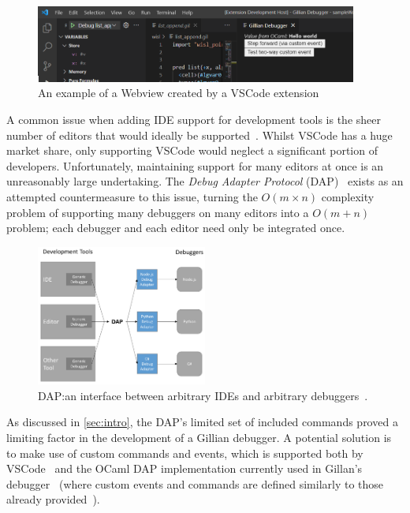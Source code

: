 \begin{figure}
  \center{}
  \includegraphics[width=400px]{img/webview-example.png}
  \caption{An example of a Webview created by a VSCode extension}\label{fig:webview-example}
\end{figure}


A common issue when adding IDE support for development tools is the sheer
number of editors that would ideally be supported~\cite{magpiebridge}. Whilst
VSCode has a huge market share, only supporting VSCode would neglect a
significant portion of developers. Unfortunately, maintaining support for many
editors at once is an unreasonably large undertaking. The \textit{Debug Adapter
Protocol} (DAP)~\cite{dap} exists as an attempted countermeasure to this issue,
turning the $O(m \times n)$ complexity problem of supporting many debuggers on
many editors into a $O(m + n)$ problem; each debugger and each editor need only
be integrated once.

\begin{figure}[!t]
  \centering
  \includegraphics[width=0.5\textwidth]{img/dap-diagram.png}
  \caption{
    DAP:\@ an interface between arbitrary IDEs and
    arbitrary debuggers~\cite{dap}.
  }\label{fig:dap-diagram}
\end{figure}

As discussed in \autoref{sec:intro}, the DAP's limited set of
included commands proved a limiting factor in the development of a Gillian
debugger. A potential solution is to make use of custom commands and events,
which is supported both by
VSCode~\cite{vscode-dap-custom-request, vscode-dap-custom-event} and the OCaml
DAP implementation currently used in Gillan's debugger~\cite{ocaml-dap} (where
custom events and commands are defined similarly to those already
provided~\cite{ocaml-dap-custom}).


